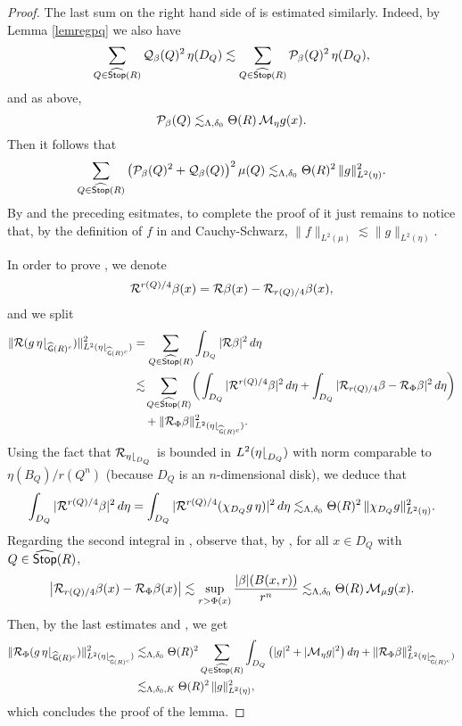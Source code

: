 \begin{proof}
The last sum on the right hand side of  is estimated similarly. Indeed, 
by Lemma \ref{lemregpq} we also have
$$\sum_{Q\in{\widehat{{\mathsf {Stop}}}}(R)}{\mathcal Q}_\beta(Q)^2\,\eta(D_Q) \lesssim 
\sum_{Q\in{\widehat{{\mathsf {Stop}}}}(R)}{\mathcal P}_\beta(Q)^2\,\eta(D_Q),$$
and as above,
$${\mathcal P}_\beta(Q) \lesssim_{\Lambda,\delta_0}\Theta(R)\,{\mathcal M}_\eta g(x).
$$
Then it follows that
$$\sum_{Q\in{\widehat{{\mathsf {Stop}}}}(R)}\big({\mathcal P}_\beta(Q)^2 + {\mathcal Q}_\beta(Q)\big)^2\,\mu(Q) \lesssim_{\Lambda,\delta_0}\Theta(R)^2\,\|g\|_{L^2(\eta)}^2.$$
By  and the preceding esitmates, to complete the proof of  it just remains
to notice that, by the definition of $f$ in  and Cauchy-Schwarz, $\|f\|_{L^2(\mu)}\lesssim
\|g\|_{L^2(\eta)}$.

In order to prove , we denote
$${\mathcal R}^{r(Q)/4}\beta(x) = {\mathcal R}\beta(x) - {\mathcal R}_{r(Q)/4}\beta(x),$$
and we split
\begin{align}\label{eqalgud77}
\|{\mathcal R} (g\,\eta{\lfloor}_{{\widehat{{\mathsf{G}}}}(R)^c})\|_{L^2(\eta{\lfloor}_{{\widehat{{\mathsf{G}}}}(R)^c})}^2 
 & = \sum_{Q\in{\widehat{{\mathsf {Stop}}}}(R)} \int_{D_Q} |{\mathcal R} \beta|^2\,d\eta\\
& \lesssim \!\sum_{Q\in{\widehat{{\mathsf {Stop}}}}(R)}\! \bigg(\int_{D_Q} |{\mathcal R}^{r(Q)/4}\beta|^2\,d\eta +\int_{D_Q} 
|{\mathcal R}_{r(Q)/4}\beta - {\mathcal R}_\Phi \beta|^2\,d\eta\bigg)\nonumber\\
& \quad + \|{\mathcal R}_\Phi \beta\|_{L^2(\eta{\lfloor}_{{\widehat{{\mathsf{G}}}}(R)^c})}^2.\nonumber
\end{align}
Using the fact that ${\mathcal R}_{\eta{\lfloor}_{D_Q}}$ is bounded in $L^2(\eta{\lfloor}_{D_Q})$ with norm 
comparable to $\eta(B_Q)/r(Q^n)$ (because $D_Q$
is an $n$-dimensional disk), we deduce that
$$\int_{D_Q} |{\mathcal R}^{r(Q)/4}\beta|^2\,d\eta = \int_{D_Q}
|{\mathcal R}^{r(Q)/4}(\chi_{D_Q}g\,\eta)|^2\,d\eta \lesssim_{\Lambda,\delta_0} \Theta(R)^2\,\|\chi_{D_Q}g\|_{
L^2(\eta)}^2.$$
Regarding the second integral in , 
observe that, by , for all $x\in D_Q$ with
$Q\in {\widehat{{\mathsf {Stop}}}}(R)$,
$$\bigl|{\mathcal R}_{r(Q)/4}\beta(x) - {\mathcal R}_{\Phi}\beta(x)\bigr|\lesssim  \sup_{r> \Phi(x)}\frac{|\beta|(B(x,r))}{r^n} \lesssim_{\Lambda,\delta_0} \Theta(R)\,{\mathcal M}_\mu g(x).$$
Then, by the last estimates and , we get
\begin{align*}%
\|\RR_\Phi (g\,\eta\rest_{\wh\sG(R)^c})\|_{L^2(\eta\rest_{\wh\sG(R)^c})}^2 
& \lesssim_{\Lambda,\delta_0}\Theta(R)^2 \sum_{Q\in\wh\sss(R)} \int_{D_Q} \big(|g|^2 + |\cM_\eta g|^2\big)\,d\eta + \|\RR_\Phi \beta\|_{L^2(\eta\rest_{\wh\sG(R)^c})}^2\\
&\lesssim_{\Lambda,\delta_0,K}\Theta(R)^2\,
\|g\|_{L^2(\eta)}^2,
\end{align*}
which concludes the proof of the lemma.
\end{proof}

